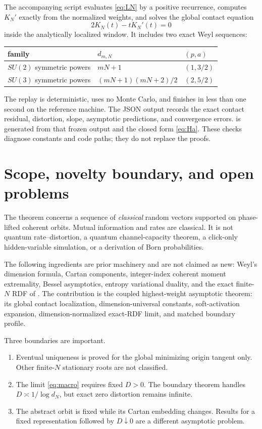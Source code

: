 \documentclass[11pt]{article}
\begin{document}
The accompanying script evaluates \cref{eq:LN} by a positive recurrence,
computes $K_N'$ exactly from the normalized weights, and solves the global
contact equation
\[
 2K_N(t)-tK_N'(t)=0
\]
inside the analytically localized window.  It includes two exact Weyl
sequences:
\begin{center}
\begin{tabular}{@{}lll@{}}
\toprule
family & $d_{m,N}$ & $(p,a)$\\
\midrule
$SU(2)$ symmetric powers & $mN+1$ & $(1,3/2)$\\
$SU(3)$ symmetric powers & $(mN+1)(mN+2)/2$ & $(2,5/2)$\\
\bottomrule
\end{tabular}
\end{center}
The replay is deterministic, uses no Monte Carlo, and finishes in less than
one second on the reference machine.  The JSON output records the exact
contact residual, distortion, slope, asymptotic predictions, and convergence
errors.   is generated from that frozen output and the
closed form \cref{eq:Ha}.  These checks diagnose constants and code paths;
they do not replace the proofs.

\section{Scope, novelty boundary, and open problems}

The theorem concerns a sequence of \emph{classical} random vectors supported
on phase-lifted coherent orbits.  Mutual information and rates are classical.
It is not quantum rate--distortion, a quantum channel-capacity theorem, a
click-only hidden-variable simulation, or a derivation of Born probabilities.

The following ingredients are prior machinery and are not claimed as new:
Weyl's dimension formula, Cartan components, integer-index coherent moment
extremality, Bessel asymptotics, entropy variational duality, and the exact
finite-$N$ RDF of \cite{Eriksson2026Coherent}.  The contribution is the
coupled highest-weight asymptotic theorem: its global contact localization,
dimension-universal constants, soft-activation expansion,
dimension-normalized exact-RDF limit, and matched boundary profile.

Three boundaries are important.
\begin{enumerate}[leftmargin=2em]
 \item Eventual uniqueness is proved for the global minimizing origin
 tangent only.  Other finite-$N$ stationary roots are not classified.
 \item The limit \cref{eq:macro} requires fixed $D>0$.  The boundary theorem
 handles $D\asymp1/\log d_N$, but exact zero distortion remains infinite.
 \item The abstract orbit is fixed while its Cartan embedding changes.
 Results for a fixed representation followed by $D\downarrow0$ are a
 different asymptotic problem.
\end{enumerate}
\end{document}
